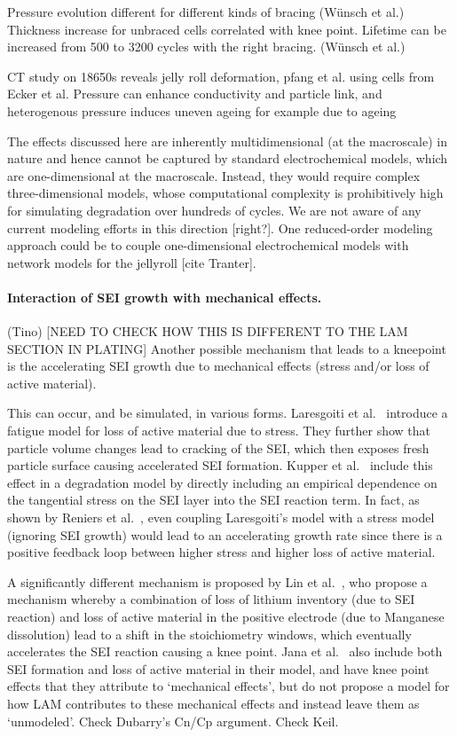 \documentclass{article}
\begin{document}
Pressure evolution different for different kinds of bracing (Wünsch et al.) Thickness increase for unbraced cells correlated with knee point. Lifetime can be increased from 500 to 3200 cycles with the right bracing. (Wünsch et al.)

CT study on 18650s reveals jelly roll deformation, pfang et al. \cite{pfrang_long-term_2018} using cells from Ecker et al. \cite{ecker_calendar_2014}
Pressure can enhance conductivity and particle link, and heterogenous pressure induces uneven ageing for example due to ageing \cite{bach_nonlinear_2016}

The effects discussed here are inherently multidimensional (at the macroscale) in nature and hence cannot be captured by standard electrochemical models, which are one-dimensional at the macroscale. Instead, they would require complex three-dimensional models, whose computational complexity is prohibitively high for simulating degradation over hundreds of cycles. We are not aware of any current modeling efforts in this direction [right?]. One reduced-order modeling approach could be to couple one-dimensional electrochemical models with network models for the jellyroll [cite Tranter].

\paragraph{Interaction of SEI growth with mechanical effects.} (Tino) [NEED TO CHECK HOW THIS IS DIFFERENT TO THE LAM SECTION IN PLATING]
Another possible mechanism that leads to a kneepoint is the accelerating SEI growth due to mechanical effects (stress and/or loss of active material).

This can occur, and be simulated, in various forms.
Laresgoiti et al.~\cite{laresgoiti_modeling_2015} introduce a fatigue model for loss of active material due to stress. They further show that particle volume changes lead to cracking of the SEI, which then exposes fresh particle surface causing accelerated SEI formation. Kupper et al.~\cite{kupper_end--life_2018} include this effect in a degradation model by directly including an empirical dependence on the tangential stress on the SEI layer into the SEI reaction term. In fact, as shown by Reniers et al.~\cite{reniers_review_2019}, even coupling Laresgoiti's model with a stress model (ignoring SEI growth) would lead to an accelerating growth rate since there is a positive feedback loop between higher stress and higher loss of active material.

A significantly different mechanism is proposed by Lin et al.~\cite{lin_comprehensive_2013}, who propose a mechanism whereby a combination of loss of lithium inventory (due to SEI reaction) and loss of active material in the positive electrode (due to Manganese dissolution) lead to a shift in the stoichiometry windows, which eventually accelerates the SEI reaction causing a knee point.
Jana et al.~\cite{jana_physical_2019} also include both SEI formation and loss of active material in their model, and have knee point effects that they attribute to `mechanical effects', but do not propose a model for how LAM contributes to these mechanical effects and instead leave them as `unmodeled'.
Check Dubarry's Cn/Cp argument.
Check Keil.
\end{document}
